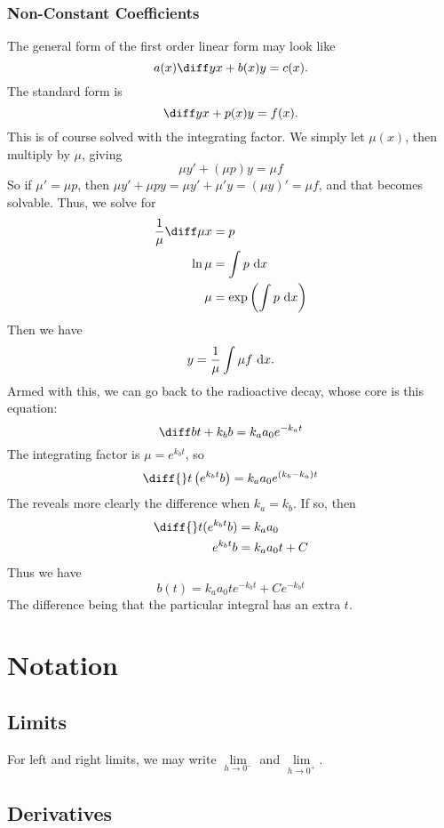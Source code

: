\documentclass[12pt]{article}
\begin{document}
\subsubsection{Non-Constant Coefficients}

The general form of the first order linear form may look like 
\[
    a(x) \diff yx + b(x) y = c(x).
\]
The standard form is
\[
\diff yx + p(x) y = f(x).
\]
This is of course solved with the integrating factor.
We simply let $\mu(x)$, then multiply by $\mu$, giving
\[
\mu y' + (\mu p) y = \mu f
\]
So if $\mu' = \mu p$, then $\mu y' + \mu p y = \mu y' + \mu' y = (\mu y)' = \mu f$,
and that becomes solvable. Thus, we solve for
\begin{align*}
    \frac{1}{\mu}\diff \mu x &= p\\
    \ln\mu &= \int p \di x\\
    \mu &= \exp\left(\int p \di x\right)
\end{align*}
Then we have
\[
y = \frac{1}{\mu}\int \mu f \ \mathrm{d} x.
\]
Armed with this, we can go back to the radioactive decay,
whose core is this equation:
\[
\diff bt + k_b b = k_a a_{0}e^{-k_a t}
\]
The integrating factor is $\mu = e^{k_b t}$, so
\[
    \diff{}t \left(e^{k_b t}b\right) = k_a a_{0} e^{(k_b - k_a)t}
\]
The reveals more clearly the difference when $k_a = k_b$. If so, then
\begin{align*}
    \diff{}t (e^{k_b t}b) &= k_a a_{0}\\
    e^{k_b t}b &= k_a a_{0}t + C\\
\end{align*}
Thus we have
\[
b(t) = k_a a_{0} t e^{-k_b t} + C e^{-k_b t}
\]
The difference being that the particular integral
has an extra $t$.


\appendix

\newpage
\section{Notation}

\subsection{Limits}

For left and right limits, we may write $\lim\limits_{h \to 0^{-}}$ and $\lim\limits_{h \to 0^{+}}.$ 

\subsection{Derivatives}
\end{document}
